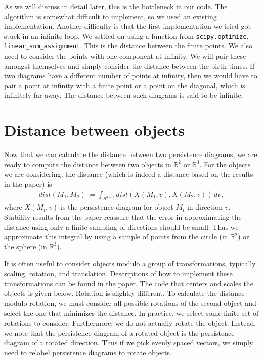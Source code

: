 \documentclass[codesnippet]{jss}
\begin{document}
As we will discuss in detail later, this is the bottleneck in our code.  The algorithm is somewhat difficult to implement, so we used an existing implementation.  Another difficulty is that the first implementation we tried got stuck in an infinite loop.  We settled on using a function from \texttt{scipy.optimize}, \texttt{linear\_sum\_assignment}.  This is the distance between the finite points.  We also need to consider the points with one component at infinity.  We will pair these amongst themselves and simply consider the distance between the birth times.  If two diagrams have a different number of points at infinity, then we would have to pair a point at infinity with a finite point or a point on the diagonal, which is infinitely far away.  The distance between such diagrams is said to be infinite.  

\section[Distance objects]{Distance between objects}
Now that we can calculate the distance between two persistence diagrams, we are ready to compute the distance between two objects in $\mathbb{R}^2$ or $\mathbb{R}^3$.  For the objects we are considering, the distance (which is indeed a distance based on the results in the paper) is
\begin{align}
dist(M_1,M_2) := \int_{S^{d-1}} dist(X(M_1,v),X(M_2,v))\,dv,
\end{align}
where $X(M_i,v)$ is the persistence diagram for object $M_i$ in direction $v$.  Stability results from the paper reassure that the error in approximating the distance using only a finite sampling of directions should be small.  Thus we approximate this integral by using a sample of points from the circle (in $\mathbb{R}^2$) or the sphere (in $\mathbb{R}^3$).  

If is often useful to consider objects modulo a group of transformations, typically scaling, rotation, and translation.  Descriptions of how to implement these transformations can be found in the paper.  The code that centers and scales the objects is given below.  Rotation is slightly different.  To calculate the distance modulo rotation, we must consider all possible rotations of the second object and select the one that minimizes the distance.  In practice, we select some finite set of rotations to consider.  Furthermore, we do not actually rotate the object.  Instead, we note that the persistence diagram of a rotated object is the persistence diagram of a rotated direction.  Thus if we pick evenly spaced vectors, we simply need to relabel persistence diagrams to rotate objects.
\end{document}
